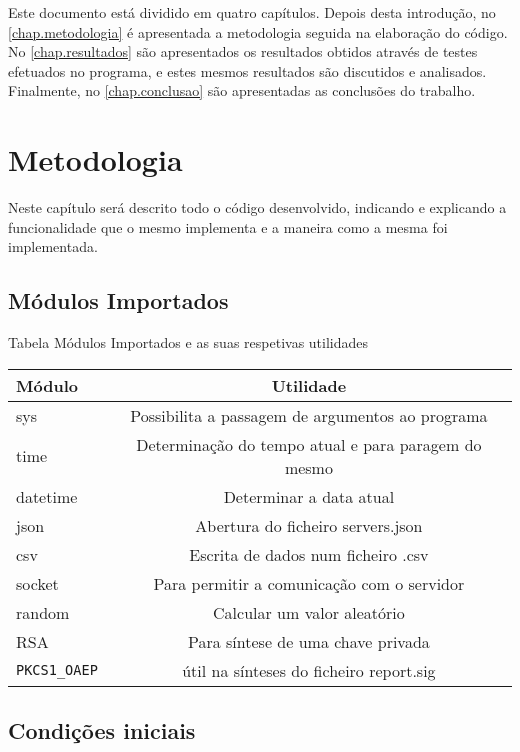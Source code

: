 \documentclass{report}
\begin{document}
Este documento está dividido em quatro capítulos.
Depois desta introdução,
no \autoref{chap.metodologia} é apresentada a metodologia seguida na elaboração do código.
No \autoref{chap.resultados} são apresentados os resultados obtidos através de testes efetuados no programa,
e estes mesmos resultados são discutidos e analisados. 
Finalmente, no \autoref{chap.conclusao} são apresentadas
as conclusões do trabalho.

\chapter{Metodologia}
\label{chap.metodologia}

Neste capítulo será descrito todo o código desenvolvido, indicando 
e explicando a funcionalidade que o mesmo implementa e a maneira como a mesma foi implementada.

\section{Módulos Importados}

\begin{table}[htp]
\caption{Tabela Módulos Importados e as suas respetivas utilidades}
\end{table}%

\begin{tabular}{|l||c|} %
%
\hline
\large \textbf{Módulo} & {\large \textbf{Utilidade}} \\ \hline
sys &  Possibilita a passagem de argumentos ao programa \\ \hline
time & Determinação do tempo atual e para paragem do mesmo \\ \hline
datetime & Determinar a data atual \\ \hline
json & Abertura do ficheiro servers.json  \\ \hline
csv & Escrita de dados num ficheiro .csv  \\ \hline
socket & Para permitir a comunicação com o servidor \\ \hline
random & Calcular um valor aleatório \\ \hline
RSA & Para síntese de uma chave privada \\ \hline
\texttt{PKCS1\_OAEP} & útil na sínteses do ficheiro report.sig \\ \hline
%
\end{tabular}



\section{Condições iniciais}
\end{document}
